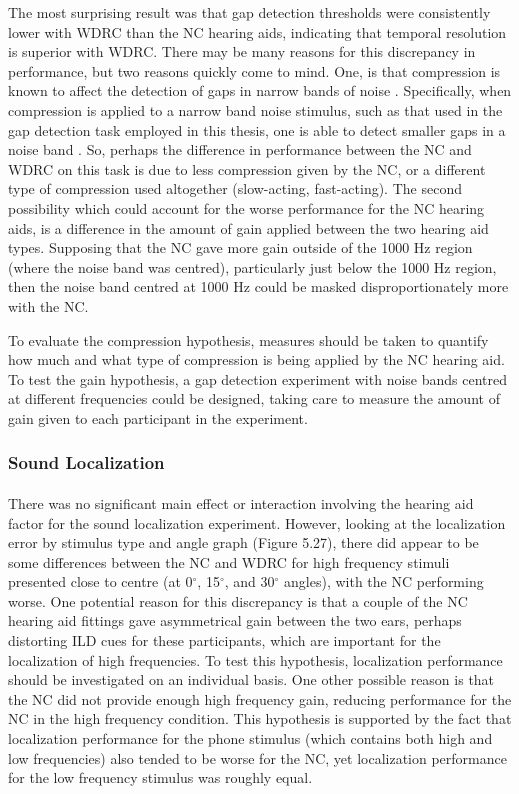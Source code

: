 The most surprising result was that gap detection thresholds were consistently lower with WDRC than the NC hearing aids, indicating that temporal resolution is superior with WDRC.  There may be many reasons for this discrepancy in performance, but two reasons quickly come to mind.  One, is that compression is known to affect the detection of gaps in narrow bands of noise \cite{Glasberg1992, Moore2001}.  Specifically, when compression is applied to a narrow band noise stimulus, such as that used in the gap detection task employed in this thesis, one is able to detect smaller gaps in a noise band \cite{Glasberg1992}.  So, perhaps the difference in performance between the NC and WDRC on this task is due to less compression given by the NC, or a different type of compression used altogether (slow-acting, fast-acting).  The second possibility which could account for the worse performance for the NC hearing aids, is a difference in the amount of gain applied between the two hearing aid types.  Supposing that the NC gave more gain outside of the 1000 Hz region (where the noise band was centred), particularly just below the 1000 Hz region, then the noise band centred at 1000 Hz could be masked disproportionately more with the NC.

To evaluate the compression hypothesis, measures should be taken to quantify how much and what type of compression is being applied by the NC hearing aid.  To test the gain hypothesis, a gap detection experiment with noise bands centred at different frequencies could be designed, taking care to measure the amount of gain given to each participant in the experiment.

\subsubsection{Sound Localization}
\paragraph{}There was no significant main effect or interaction involving the hearing aid factor for the sound localization experiment.  However, looking at the localization error by stimulus type and angle graph (Figure 5.27), there did appear to be some differences between the NC and WDRC for high frequency stimuli presented close to centre (at 0$^\circ$, 15$^\circ$, and 30$^\circ$ angles), with the NC performing worse.  One potential reason for this discrepancy is that a couple of the NC hearing aid fittings gave asymmetrical gain between the two ears, perhaps distorting ILD cues for these participants, which are important for the localization of high frequencies.  To test this hypothesis, localization performance should be investigated on an individual basis.  One other possible reason is that the NC did not provide enough high frequency gain, reducing performance for the NC in the high frequency condition.  This hypothesis is supported by the fact that localization performance for the phone stimulus (which contains both high and low frequencies) also tended to be worse for the NC, yet localization performance for the low frequency stimulus was roughly equal.

